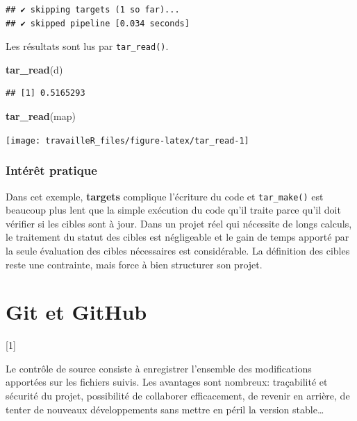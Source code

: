 \documentclass[
  12pt,
  french,
  a4paper,
  extrafontsizes,onecolumn,openright
  ]{memoir}
\newenvironment{Shaded}{\begin{snugshade}}{\end{snugshade}}
\newcommand{\FunctionTok}[1]{\textcolor[rgb]{0.13,0.29,0.53}{\textbf{#1}}}
\newcommand{\NormalTok}[1]{#1}
\newcommand{\toc}[1]{%
  \startcontents[chapters]%
  \printcontents[chapters]{}{1}[#1]{}%
  ~\newline%
}
\begin{document}
\begin{verbatim}
## ✔ skipping targets (1 so far)...
## ✔ skipped pipeline [0.034 seconds]
\end{verbatim}

\normalsize

Les résultats sont lus par \texttt{tar\_read()}.

\scriptsize

\begin{Shaded}
\begin{Highlighting}[]
\FunctionTok{tar\_read}\NormalTok{(d)}
\end{Highlighting}
\end{Shaded}

\begin{verbatim}
## [1] 0.5165293
\end{verbatim}

\begin{Shaded}
\begin{Highlighting}[]
\FunctionTok{tar\_read}\NormalTok{(map)}
\end{Highlighting}
\end{Shaded}

\begin{center}\texttt{[image: travailleR\_files/figure-latex/tar\_read-1]} \end{center}

\normalsize

\subsection{Intérêt pratique}\label{intuxe9ruxeat-pratique}

Dans cet exemple, \textbf{targets} complique l'écriture du code et \texttt{tar\_make()} est beaucoup plus lent que la simple exécution du code qu'il traite parce qu'il doit vérifier si les cibles sont à jour.
Dans un projet réel qui nécessite de longs calculs, le traitement du statut des cibles est négligeable et le gain de temps apporté par la seule évaluation des cibles nécessaires est considérable.
La définition des cibles reste une contrainte, mais force à bien structurer son projet.

\chapter{Git et GitHub}\label{chap-git}

\toc{1}

Le contrôle de source consiste à enregistrer l'ensemble des modifications apportées sur les fichiers suivis.
Les avantages sont nombreux: traçabilité et sécurité du projet, possibilité de collaborer efficacement, de revenir en arrière, de tenter de nouveaux développements sans mettre en péril la version stable\ldots{}
\end{document}
